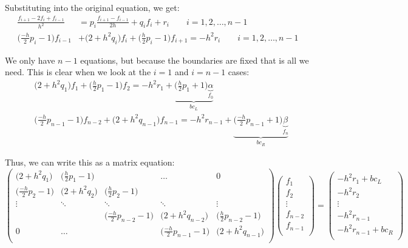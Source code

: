 \documentclass[12pt]{article}
\begin{document}
Substituting into the original equation, we get:
\begin{align}
\frac{f_{i+1} - 2f_i + f_{i-1}}{h^2} &= p_i \frac{f_{i+1} - f_{i-1}}{2h} + q_i f_i + r_i \qquad i = 1, 2, \dots, n-1 \nonumber \\
%
\bigl(\frac{-h}{2}p_i - 1\bigr) f_{i-1} &+ \bigl(2 + h^2q_i\bigr)f_i + \bigl(\frac{h}{2}p_i - 1\bigr) f_{i+1} = -h^2 r_i \qquad i = 1, 2, \dots, n-1 \nonumber
\end{align}

We only have $n-1$ equations, but because the boundaries are fixed that is all we need. This is clear when we look at the $i=1$ and $i=n-1$ cases:
\begin{align}
&\bigl(2 + h^2q_1\bigr)f_1 + \bigl(\frac{h}{2}p_1 - 1\bigr) f_{2} = -h^2 r_1 + \underbrace{\bigl(\frac{h}{2}p_1 + 1\bigr) \underbrace{\alpha}_{f_0}}_{bc_L} \nonumber \\
&\bigl(\frac{-h}{2}p_{n-1} - 1\bigr) f_{n-2} + \bigl(2 + h^2q_{n-1}\bigr)f_{n-1} = -h^2 r_{n-1} + \underbrace{\bigl(\frac{-h}{2}p_{n-1} + 1\bigr) \underbrace{\beta}_{f_n}}_{bc_R} \nonumber
\end{align}

Thus, we can write this as a matrix equation:
\begin{equation}
\begin{pmatrix}
\bigl(2 + h^2q_1\bigr) & \bigl(\frac{h}{2}p_1 - 1\bigr) & & \hdots & 0 \\
%
\bigl(\frac{-h}{2}p_2 - 1\bigr) & \bigl(2 + h^2q_2\bigr) & \bigl(\frac{h}{2}p_2 - 1\bigr) & &  \\
\vdots & \ddots & \ddots & \ddots & \vdots \\
& & \bigl(\frac{-h}{2}p_{n-2} - 1\bigr) & \bigl(2 + h^2q_{n-2}\bigr)  & \bigl(\frac{h}{2}p_{n-2} - 1\bigr) \\
0 & \hdots & & \bigl(\frac{-h}{2}p_{n-1} - 1\bigr) & \bigl(2 + h^2q_{n-1}\bigr) \\
\end{pmatrix}
%
\begin{pmatrix}
f_1 \\ f_2 \\ \vdots \\ f_{n-2} \\ f_{n-1} \\
\end{pmatrix}
= 
\begin{pmatrix}
-h^2 r_1 + bc_L \\ -h^2 r_2 \\ \vdots \\ -h^2 r_{n-1} \\ -h^2 r_{n-1} + bc_R\\ 
\end{pmatrix}\nonumber
\end{equation}
\end{document}
